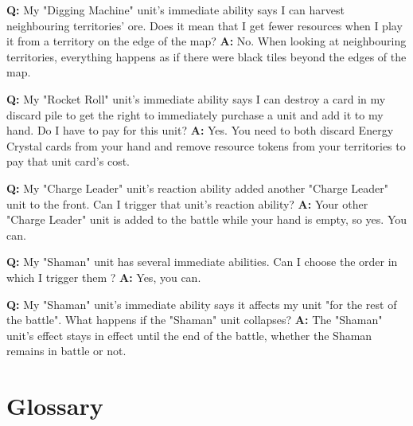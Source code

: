 \documentclass[a4paper]{article}
\begin{document}
    \hspace{-2em}
    \textbf{Q:} My "Digging Machine" unit's immediate ability says I can harvest
    neighbouring territories' ore. Does it mean that I get fewer resources when
    I play it from a territory on the edge of the map?
    \newline
    \textbf{A:} No. When looking at neighbouring territories,
    everything happens as if there were black tiles beyond the edges of the map.

    \hspace{-2em}
    \textbf{Q:} My "Rocket Roll" unit's immediate ability says I can destroy a card
    in my discard pile to get the right to immediately purchase a unit
    and add it to my hand. Do I have to pay for this unit?
    \newline
    \textbf{A:} Yes. You need to both discard Energy Crystal cards from your hand
    and remove resource tokens from your territories to pay that unit card's cost.
    
    \hspace{-2em}
    \textbf{Q:} My "Charge Leader" unit's reaction ability added another
    "Charge Leader" unit to the front. Can I trigger that unit's reaction ability?
    \newline
    \textbf{A:} Your other "Charge Leader" unit is added to the battle
    while your hand is empty, so yes. You can.
    
    \hspace{-2em}
    \textbf{Q:} My "Shaman" unit has several immediate abilities.
    Can I choose the order in which I trigger them ?
    \newline
    \textbf{A:} Yes, you can.
    
    \hspace{-2em}
    \textbf{Q:} My "Shaman" unit's immediate ability says it affects my unit
    "for the rest of the battle". What happens if the "Shaman" unit collapses?
    \newline
    \textbf{A:} The "Shaman" unit's effect stays in effect until
    the end of the battle, whether the Shaman remains in battle or not.
    
    
\newpage
\section{Glossary}
  
\end{document}
